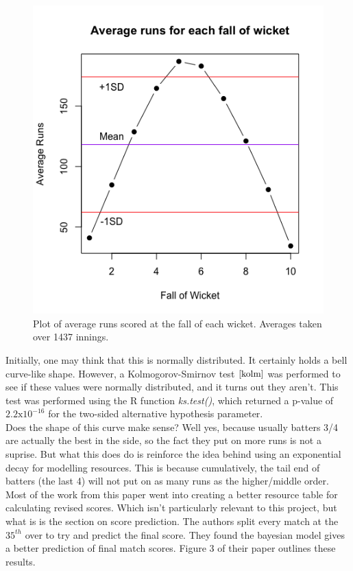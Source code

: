 \begin{figure}[h]
    \centering
    \includegraphics[scale=0.6]{figures/avgrunsfow.png}
    \caption{Plot of average runs scored at the fall of each wicket. Averages taken over 1437 innings.}
    \label{avgrunsfow}
\end{figure}
Initially, one may think that this is normally distributed. It certainly holds a bell curve-like shape. However, a Kolmogorov-Smirnov test $\cite{kolm}$ was
performed to see if these values were normally distributed, and it turns out they aren't. This test was performed using the R function \textit{ks.test()}, which returned
a p-value of $2.2\text{x}10^{-16}$ for the two-sided alternative hypothesis parameter. \\

Does the shape of this curve make sense? Well yes, because usually batters 3/4 are actually the best in the side, so the fact they put on more runs is not a suprise.
But what this does do is reinforce the idea behind using an exponential decay for modelling resources. This is because cumulatively, the tail end of batters (the last 4) 
will not put on as many runs as the higher/middle order. \\

Most of the work from this paper went into creating a better resource table for calculating revised scores. Which isn't particularly relevant to this project, but what is 
is the section on score prediction. The authors split every match at the $35^{th}$ over to try and predict the final score. They found the bayesian model gives a better
prediction of final match scores. Figure 3 of their paper outlines these results.